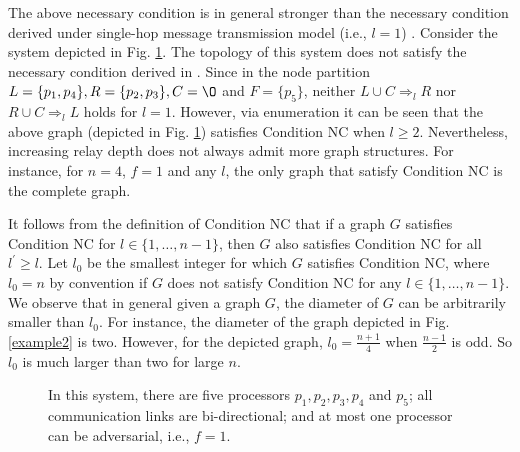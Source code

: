 \documentclass[letterpaper, 11pt]{article}
\begin{document}
The above necessary condition is in general stronger than the necessary condition derived under single-hop message transmission model (i.e., $l=1$) \cite{Vaidya2012IABC}.
Consider the system depicted in Fig. \ref{example}.  The topology of this system does not satisfy the necessary condition derived in \cite{Vaidya2012IABC}. Since in the node partition $L=\{p_1, p_4\}, R=\{p_2, p_3\}, C=\O$ and $F=\{p_5\}$, neither $L\cup C\Rightarrow_l R$ nor $R\cup C\Rightarrow_l L$ holds for $l=1$. However, via enumeration it can be seen that the above graph (depicted in Fig. \ref{example}) satisfies Condition NC when $l\ge 2$. Nevertheless, increasing relay depth does not always admit more graph structures. For instance, for $n=4$, $f=1$ and any $l$, the only graph that satisfy Condition NC is the complete graph.

It follows from the definition of Condition NC that if a graph $G$ satisfies Condition NC for $l\in \{1,\ldots, n-1\}$, then $G$ also satisfies Condition NC for all $l^{\prime}\ge l$. Let $l_0$ be the smallest integer for which $G$ satisfies Condition NC, where $l_0=n$ by convention if $G$ does not satisfy Condition NC for any $l\in \{1,\ldots, n-1\}$. We observe that in general given a graph $G$, the diameter of $G$ can be arbitrarily smaller than $l_0$. For instance, the diameter of the graph depicted in Fig. \ref{example2} is two. However, for the depicted graph, $l_0=\frac{n+1}{4}$ when $\frac{n-1}{2}$ is odd. So $l_0$ is much larger than two for large $n$.

 \begin{figure}

 \centering
    \caption{In this system, there are five processors $p_1, p_2, p_3, p_4$ and $p_5$; all communication links are bi-directional; and at most one processor can be adversarial, i.e., $f=1$. }
    \label{example}
    \end{figure}
\end{document}
